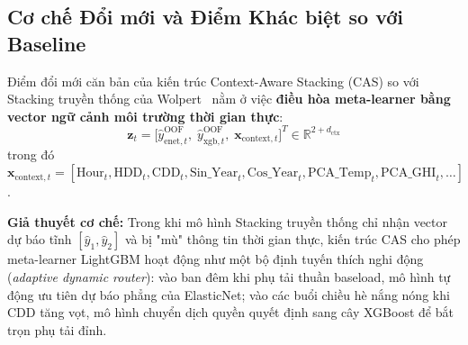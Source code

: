 \subsection{Cơ chế Đổi mới và Điểm Khác biệt so với Baseline}
Điểm đổi mới căn bản của kiến trúc Context-Aware Stacking (CAS) so với Stacking truyền thống của Wolpert~\cite{wolpert1992stacked} nằm ở việc \textbf{điều hòa meta-learner bằng vector ngữ cảnh môi trường thời gian thực}:
\begin{equation}
    \mathbf{z}_t = \Big[ \hat{y}_{\text{enet}, t}^{\text{OOF}}, \; \hat{y}_{\text{xgb}, t}^{\text{OOF}}, \; \mathbf{x}_{\text{context}, t} \Big]^T \in \mathbb{R}^{2 + d_{\text{ctx}}}
\end{equation}
trong đó $\mathbf{x}_{\text{context}, t} = [\text{Hour}_t, \text{HDD}_t, \text{CDD}_t, \text{Sin\_Year}_t, \text{Cos\_Year}_t, \text{PCA\_Temp}_t, \text{PCA\_GHI}_t, \dots]$.

\textbf{Giả thuyết cơ chế:} Trong khi mô hình Stacking truyền thống chỉ nhận vector dự báo tĩnh $[\hat{y}_1, \hat{y}_2]$ và bị "mù" thông tin thời gian thực, kiến trúc CAS cho phép meta-learner LightGBM hoạt động như một bộ định tuyến thích nghi động (\textit{adaptive dynamic router}): vào ban đêm khi phụ tải thuần baseload, mô hình tự động ưu tiên dự báo phẳng của ElasticNet; vào các buổi chiều hè nắng nóng khi CDD tăng vọt, mô hình chuyển dịch quyền quyết định sang cây XGBoost để bắt trọn phụ tải đỉnh.
